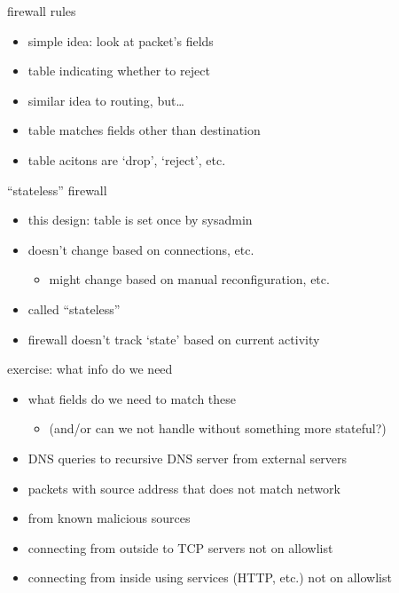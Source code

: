 \begin{frame}{firewall rules}
    \begin{itemize}
    \item simple idea: look at packet's fields
    \item table indicating whether to reject
    \vspace{.5cm}
    \item similar idea to routing, but\ldots
    \item table matches fields other than destination
    \item table acitons are `drop', `reject', etc.
    \end{itemize}
\end{frame}


\begin{frame}{``stateless'' firewall}
    \begin{itemize}
    \item this design: table is set once by sysadmin
    \item doesn't change based on connections, etc.
        \begin{itemize}
        \item might change based on manual reconfiguration, etc.
        \end{itemize}
    \vspace{.5cm}
    \item called ``stateless''
    \vspace{.5cm}
    \item firewall doesn't track `state' based on current activity
    \end{itemize}
\end{frame}

\begin{frame}{exercise: what info do we need}
    \begin{itemize}
    \item what fields do we need to match these
        \begin{itemize}
        \item (and/or can we not handle without something more stateful?)
        \end{itemize}
    \vspace{.5cm}
    \item DNS queries to recursive DNS server from external servers
    \item packets with source address that does not match network
    \item from known malicious sources
    \item connecting from outside  to TCP servers not on allowlist
    \item connecting from inside using services (HTTP, etc.) not on allowlist
    \end{itemize}
\end{frame}
